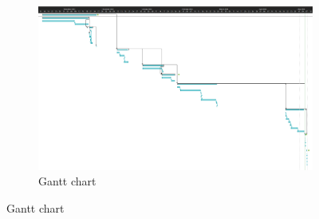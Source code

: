 \begin{figure}
\begin{subfigure}[t]{0.5\textwidth}
    \end{subfigure}
    \begin{subfigure}[b]{1.0\textwidth}
        \vspace{10px}
        \caption{Gantt chart}
        \label{fig:GanttChart}
        \includegraphics[width=1.0\textwidth, height=0.3\textheight]{Figures/GanttChart.png}
    \end{subfigure}
\end{figure}

